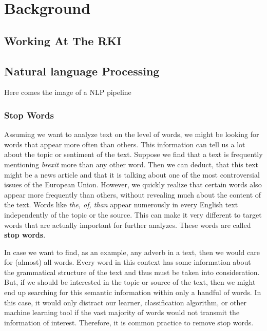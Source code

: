 \chapter{Background}

\section{Working At The RKI}

\section{Natural language Processing}
Here comes the image of a NLP pipeline

\subsection{Stop Words}
Assuming we want to analyze text on the level of words, we might be looking for
words that appear more often than others. This information can tell us a lot about
the topic or sentiment of the text. Suppose we find that a text is frequently
mentioning \textit{brexit} more than any other word. Then we can deduct, that this text might
be a news article and that it is talking about one of the most controversial issues
of the European Union. However, we quickly realize that certain words
also appear more frequently than others, without revealing much about the content
of the text. Words like \textit{the, of, than} appear numerously in every English
text independently of the topic or the source. This can make it very different to target
words that are actually important for further analyzes. These words are called \textbf{stop words}.

In case we want to find, as an example, any adverb in a text, then we would care for (almost) all words.
Every word in this context has some information about the grammatical structure of the text
and thus must be taken into consideration. But, if we should be interested in the topic
or source of the text, then we might end up searching for this semantic information within only a handful of words.
In this case, it would only distract our learner, classification algorithm, or other machine
learning tool if the vast majority of words would not transmit the information
of interest. Therefore, it is common practice to remove stop words.

